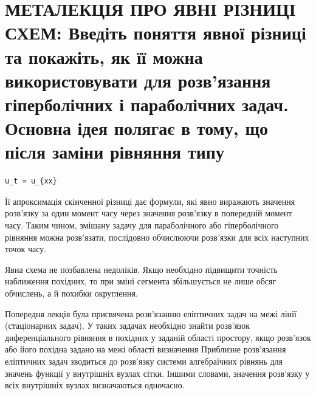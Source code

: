 \documentclass[
  ukrainian,
]{article}
\begin{document}
\section{МЕТАЛЕКЦІЯ ПРО ЯВНІ РІЗНИЦІ СХЕМ: Введіть поняття явної різниці
та покажіть, як її можна використовувати для розв'язання гіперболічних і
параболічних задач. Основна ідея полягає в тому, що після заміни
рівняння
типу}\label{ux43cux435ux442ux430ux43bux435ux43aux446ux456ux44f-ux43fux440ux43e-ux44fux432ux43dux456-ux440ux456ux437ux43dux438ux446ux456-ux441ux445ux435ux43c-ux432ux432ux435ux434ux456ux442ux44c-ux43fux43eux43dux44fux442ux442ux44f-ux44fux432ux43dux43eux457-ux440ux456ux437ux43dux438ux446ux456-ux442ux430-ux43fux43eux43aux430ux436ux456ux442ux44c-ux44fux43a-ux457ux457-ux43cux43eux436ux43dux430-ux432ux438ux43aux43eux440ux438ux441ux442ux43eux432ux443ux432ux430ux442ux438-ux434ux43bux44f-ux440ux43eux437ux432ux44fux437ux430ux43dux43dux44f-ux433ux456ux43fux435ux440ux431ux43eux43bux456ux447ux43dux438ux445-ux456-ux43fux430ux440ux430ux431ux43eux43bux456ux447ux43dux438ux445-ux437ux430ux434ux430ux447.-ux43eux441ux43dux43eux432ux43dux430-ux456ux434ux435ux44f-ux43fux43eux43bux44fux433ux430ux454-ux432-ux442ux43eux43cux443-ux449ux43e-ux43fux456ux441ux43bux44f-ux437ux430ux43cux456ux43dux438-ux440ux456ux432ux43dux44fux43dux43dux44f-ux442ux438ux43fux443}

\begin{verbatim}
u_t = u_{xx}
\end{verbatim}

Її апроксимація скінченної різниці дає формули, які явно виражають
значення розв'язку за один момент часу через значення розв'язку в
попередній момент часу. Таким чином, змішану задачу для параболічного
або гіперболічного рівняння можна розв'язати, послідовно обчислюючи
розв'язки для всіх наступних точок часу.

Явна схема не позбавлена недоліків. Якщо необхідно підвищити точність
наближення похідних, то при зміні сегмента збільшується не лише обсяг
обчислень, а й похибки округлення.

Попередня лекція була присвячена розв'язанню еліптичних задач на межі
лінії (стаціонарних задач). У таких задачах необхідно знайти розв'язок
диференціального рівняння в похідних у заданій області простору, якщо
розв'язок або його похідна задано на межі області визначення Приблизне
розв'язання еліптичних задач зводиться до розв'язку системи алгебраїчних
рівнянь для значень функції у внутрішніх вузлах сітки. Іншими словами,
значення розв'язку у всіх внутрішніх вузлах визначаються одночасно.
\end{document}
